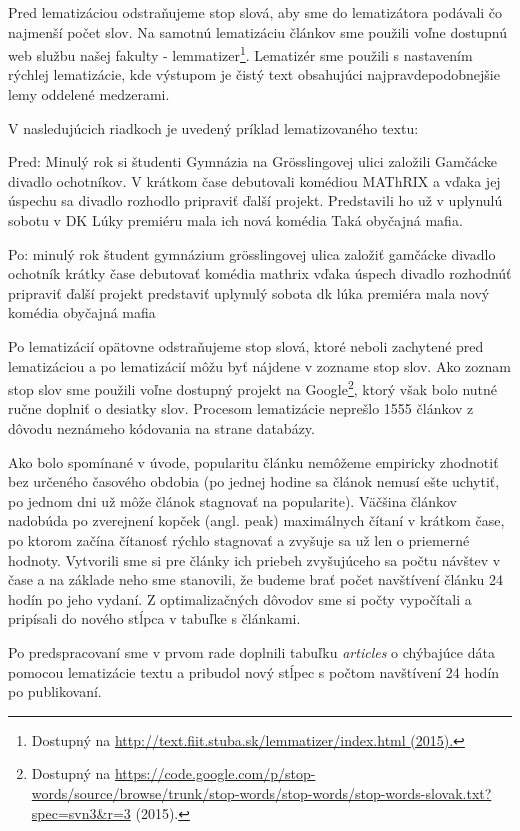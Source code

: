 \documentclass[runningheads,a4paper]{llncs}
\begin{document}
Pred lematizáciou odstraňujeme stop slová, aby sme do lematizátora podávali čo najmenší počet slov.
Na samotnú lematizáciu článkov sme použili voľne dostupnú web službu našej fakulty - lemmatizer\footnote{Dostupný na \url{http://text.fiit.stuba.sk/lemmatizer/index.html (2015).}}.
Lematizér sme použili s nastavením rýchlej lematizácie, kde výstupom je čistý text obsahujúci najpravdepodobnejšie lemy oddelené medzerami.

V nasledujúcich riadkoch je uvedený príklad lematizovaného textu:

\begin{multicols}{2}
Pred: Minulý rok si študenti Gymnázia na Grösslingovej ulici založili Gamčácke divadlo ochotníkov. V krátkom čase debutovali komédiou MAThRIX a vďaka jej úspechu sa divadlo rozhodlo pripraviť ďalší projekt. Predstavili ho už v uplynulú sobotu v DK Lúky premiéru mala ich nová komédia Taká obyčajná mafia.

Po: minulý rok študent gymnázium grösslingovej ulica založiť gamčácke divadlo ochotník krátky čase debutovať komédia mathrix vďaka úspech divadlo rozhodnúť pripraviť ďalší projekt predstaviť uplynulý sobota dk lúka premiéra mala nový komédia obyčajná mafia
\end{multicols}

Po lematizácií opätovne odstraňujeme stop slová, ktoré neboli zachytené pred lematizáciou a po lematizácií môžu byť nájdene v zozname stop slov.
Ako zoznam stop slov sme použili voľne dostupný projekt na Google\footnote{Dostupný na \url{https://code.google.com/p/stop-words/source/browse/trunk/stop-words/stop-words/stop-words-slovak.txt?spec=svn3&r=3} (2015).}, ktorý však bolo nutné ručne doplniť o desiatky slov.
Procesom lematizácie neprešlo 1555 článkov z dôvodu neznámeho kódovania na strane databázy.

Ako bolo spomínané v úvode, popularitu článku nemôžeme empiricky zhodnotiť bez určeného časového obdobia (po jednej hodine sa článok nemusí ešte uchytiť, po jednom dni už môže článok stagnovať na popularite).
Väčšina článkov nadobúda po zverejnení kopček (angl. peak) maximálnych čítaní v krátkom čase, po ktorom začína čítanosť rýchlo stagnovať a zvyšuje sa už len o priemerné hodnoty.
Vytvorili sme si pre články ich priebeh zvyšujúceho sa počtu návštev v čase a na základe neho sme stanovili, že budeme brať počet navštívení článku 24 hodín po jeho vydaní.
Z optimalizačných dôvodov sme si počty vypočítali a pripísali do nového stĺpca v tabuľke s článkami.

Po predspracovaní sme v prvom rade doplnili tabuľku {\em articles} o chýbajúce dáta pomocou lematizácie textu a pribudol nový stĺpec s počtom navštívení 24 hodín po publikovaní.
\end{document}
